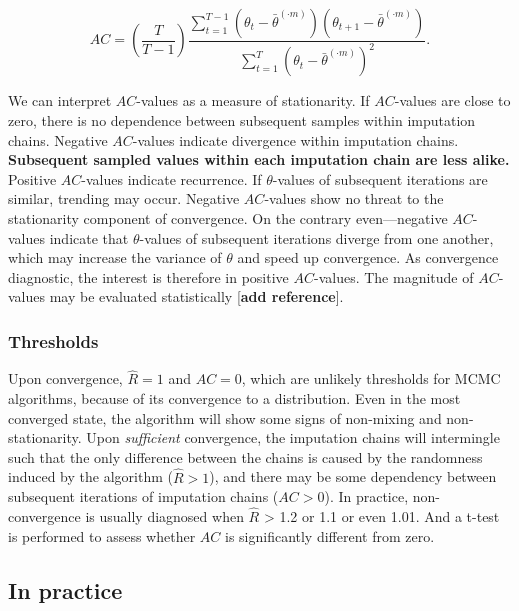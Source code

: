 \documentclass[Royal,times,sageh]{sagej}
\begin{document}
\begin{equation*}
AC = \left( \frac{T}{T-1} \right) \frac{\sum_{t=1}^{T-1}(\theta_t - \bar{\theta}^{(\cdot m)})(\theta_{t+1} - \bar{\theta}^{(\cdot m)})}{\sum_{t=1}^{T}(\theta_t - \bar{\theta}^{(\cdot m)})^2}.
\end{equation*}

We can interpret \(AC\)-values as a measure of stationarity. If \(AC\)-values are close to zero, there is no dependence between subsequent samples within imputation chains. Negative \(AC\)-values indicate divergence within imputation chains. \textbf{Subsequent sampled values within each imputation chain are less alike.} Positive \(AC\)-values indicate recurrence. If \(\theta\)-values of subsequent iterations are similar, trending may occur. Negative \(AC\)-values show no threat to the stationarity component of convergence. On the contrary even---negative \(AC\)-values indicate that \(\theta\)-values of subsequent iterations diverge from one another, which may increase the variance of \(\theta\) and speed up convergence. As convergence diagnostic, the interest is therefore in positive \(AC\)-values. The magnitude of \(AC\)-values may be evaluated statistically {[}\textbf{add reference}{]}.

\hypertarget{thresholds}{%
\subsubsection{Thresholds}\label{thresholds}}

Upon convergence, \(\widehat{R}=1\) and \(AC=0\), which are unlikely thresholds for MCMC algorithms, because of its convergence to a distribution. Even in the most converged state, the algorithm will show some signs of non-mixing and non-stationarity. Upon \emph{sufficient} convergence, the imputation chains will intermingle such that the only difference between the chains is caused by the randomness induced by the algorithm (\(\widehat{R} > 1\)), and there may be some dependency between subsequent iterations of imputation chains (\(AC > 0\)). In practice, non-convergence is usually diagnosed when \(\widehat{R}\) \textgreater{} 1.2 or 1.1 or even 1.01. And a t-test is performed to assess whether \(AC\) is significantly different from zero.

\hypertarget{in-practice}{%
\subsection{In practice}\label{in-practice}}
\end{document}
